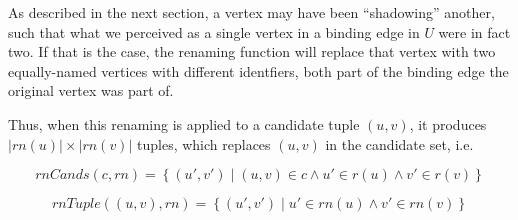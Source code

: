\documentclass[\master/Master.tex]{subfiles}
\begin{document}
As described in the next section, a vertex may have been ``shadowing'' another, such that what we perceived as a single vertex in a binding edge in $U$ were in fact two. If that is the case, the renaming function will replace that vertex with two equally-named vertices with different identfiers, both part of the binding edge the original vertex was part of. 

Thus, when this renaming is applied to a candidate tuple $(u,v)$, it produces $|rn(u)| \times |rn(v)|$ tuples, which replaces $(u,v)$ in the candidate set, i.e.\ 

\begin{equation*}
    rnCands(c, rn) =
    \left\{ 
        \left( u', v' \right) \mid 
        (u, v) \in c \land u' \in r(u) \land v' \in r(v) 
    \right\}
\end{equation*}

%

\begin{equation*}
    rnTuple\left( (u,v), rn \right) =
    \left\{
        \left( u', v' \right) \mid u' \in rn(u) \land v' \in rn(v)
    \right\}
\end{equation*}
\end{document}
